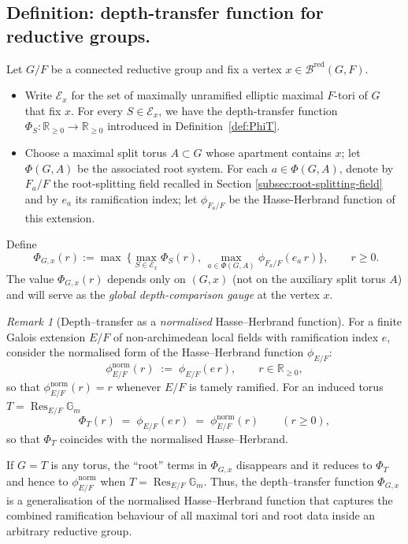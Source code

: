 \documentclass[american]{article}
\numberwithin{equation}{section}
\numberwithin{figure}{section}
\theoremstyle{plain}
\theoremstyle{definition}
\theoremstyle{remark}
\newtheorem{remark}[theorem]{Remark}
\DeclareMathOperator{\Res}{Res}
\begin{document}
\subsection{Definition:  depth-transfer function for reductive groups.}\label{subsec:defglobaldepcomp}
Let $G/F$ be a connected reductive group and fix a vertex $x\in\mathcal{B}^{\mathrm{red}}(G,F)$.
\begin{itemize}
\item Write $\mathscr{E}_x$ for the set of maximally unramified elliptic maximal $F$-tori of $G$ that fix $x$. For every $S\in\mathscr{E}_x$, we have the depth-transfer function $\Phi_{S} : \mathbb{R}_{\ge0} \to \mathbb{R}_{\ge0}$ introduced in Definition~\ref{def:PhiT}.
\item Choose a maximal split torus $A\subset G$ whose apartment contains $x$; let $\Phi(G,A)$ be the associated root system. For each $a\in\Phi(G,A)$, denote by $F_{a}/F$ the root-splitting field recalled in Section \ref{subsec:root-splitting-field} and by $e_a$ its ramification index; let $\phi_{F_a/F}$ be the Hasse-Herbrand function of this extension.
\end{itemize}
Define
\[
\boxed{\; \Phi_{G,x}(r) := \max~ \! \bigl\{ \max_{S\in\mathscr{E}_x}\Phi_S(r), \, \max_{a\in\Phi(G,A)}\phi_{F_a/F}(e_a\,r) \bigr\}, \qquad r\ge0. }
\]
The value $\Phi_{G,x}(r)$ depends only on $(G,x)$ (not on the auxiliary split torus $A$) and will serve as the \emph{global depth-comparison gauge} at the vertex $x$.

\begin{remark}[Depth--transfer as a \emph{normalised} Hasse--Herbrand function]
\label{R:Phi-vs-HH}
For a finite Galois extension $E/F$ of non-archimedean local fields with ramification
index $e$, consider the normalised form of the Hasse--Herbrand function \(\phi_{E/F}\):
\[
   \phi_{E/F}^{\mathrm{norm}}(r)\;:=\;
   \phi_{E/F}(e\,r), 
   \qquad r\in\mathbb R_{\ge 0},
\]
so that $\phi_{E/F}^{\mathrm{norm}}(r)=r$ whenever $E/F$ is tamely ramified.
For an induced torus $T=\Res_{E/F}\mathbb G_{m}$
\[
   \Phi_{T}(r)\;=\;\phi_{E/F}(e\,r)
                 \;=\;\phi_{E/F}^{\mathrm{norm}}(r) 
                 \qquad (r\ge 0) , 
\] 
so that $\Phi_{T}$ coincides with the normalised Hasse--Herbrand.

If $G=T$ is any torus, the ``root'' terms in $\Phi_{G,x}$ disappears and it reduces to $\Phi_{T}$ and
hence to $\phi_{E/F}^{\mathrm{norm}}$ when $T=\Res_{E/F}\mathbb G_{m}$. Thus, the depth--transfer function $\Phi_{G,x}$ is a generalisation of the normalised Hasse--Herbrand function that captures the combined ramification behaviour of all maximal tori and root data inside an arbitrary reductive group. 

\end{remark}
\end{document}
